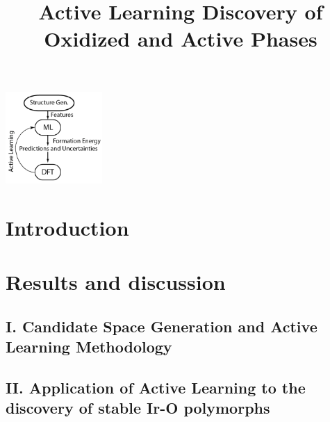 \documentclass[a6paper,journal=jacsat,manuscript=article]{achemso}  %
\title[ML discovered IrOx phases]{
  Active Learning Discovery of Oxidized and Active \IrOx Phases}
\begin{document}
\begin{tocentry}
\begin{center}
\includegraphics[height=3.5cm]{02_figures/Surrogate_model}
\end{center}
\end{tocentry}


\begin{abstract}

\end{abstract}

\section{Introduction}


\section{Results and discussion}

  \subsection{I. Candidate Space Generation and Active Learning Methodology}
  

  \subsection{II. Application of Active Learning to the discovery of stable Ir-O polymorphs}
  
\end{document}
